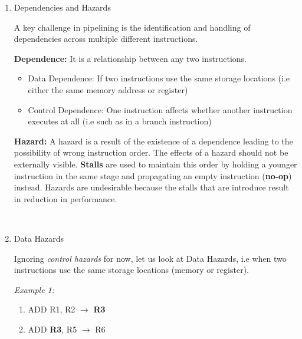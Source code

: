 \documentclass[12pt]{article}
\newenvironment{QandA}{\begin{enumerate}[label=\bfseries\arabic*.]\bfseries}
                      {\end{enumerate}}
\newenvironment{answered}{\par\quad\normalfont}{}
\begin{document}
\begin{QandA}
\begin{answered}
    Therefore longer (deeper) pipelines show diminishing clock frequency gains. However, in our example, we can assume that our clock period = \textbf{10ns} + overheads = \textbf{12ns}. And let's say that our CPI = 1 + pipeline penalty = \textbf{1.5}. Our effective performance will then be \textbf{12ns $\times$ 1.5 = 18ns/insn}.
    \end{answered}
    
    \item Dependencies and Hazards
    \begin{answered}
    A key challenge in pipelining is the identification and handling of dependencies across multiple different instructions.
    
    \textbf{Dependence:} It is a relationship between any two instructions.
    
    \begin{itemize}
        \item Data Dependence: If two instructions use the same storage locations (i.e either the same memory address or register)
        \item Control Dependence: One instruction affects whether another instruction executes at all (i.e such as in a branch instruction)
    \end{itemize}
    
    \textbf{Hazard:} A hazard is a result of the existence of a dependence leading to the possibility of wrong instruction order. The effects of a hazard should not be externally visible. \textbf{Stalls} are used to maintain this order by holding a younger instruction in the same stage and propagating an empty instruction (\textbf{no-op}) instead. Hazards are undesirable because the stalls that are introduce result in reduction in performance.
    \end{answered}
    
    \ 
    
    \item Data Hazards
    \begin{answered}
    Ignoring \textit{control hazards} for now, let us look at Data Hazards, i.e when two instructions use the same storage locations (memory or register). 
    
    \textit{Example 1:}
    \begin{enumerate}
        \item ADD R1, R2 $\rightarrow$ \textbf{R3}
        \item ADD \textbf{R3}, R5 $\rightarrow$ R6
    \end{enumerate}
    

\end{answered}
\end{QandA}
\end{document}
